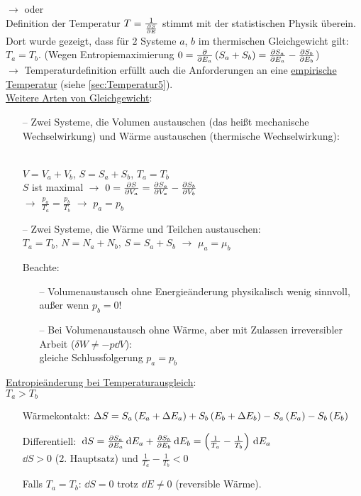 $\rightarrow$  oder \\
Definition der Temperatur $T = \frac{1}{\frac{\partial S}{\partial E}}$ stimmt mit der statistischen Physik überein.\\
Dort wurde gezeigt, dass für $2$ Systeme $a$, $b$ im thermischen Gleichgewicht gilt: $T_a= T_b$. (Wegen Entropiemaximierung $0=\frac{\partial }{\partial E_a}\left( S_a+S_b \right) = \frac{\partial S_a}{\partial E_a} - \frac{\partial S_b}{\partial E_b}$)\\
$\rightarrow$ Temperaturdefinition erfüllt auch die Anforderungen an eine \uline{empirische Temperatur} (siehe \ref{sec:Temperatur5}).\\
\uline{Weitere Arten von Gleichgewicht}:

\begin{itemize}[align=left]
  \item[--] Zwei Systeme, die Volumen austauschen (das heißt mechanische Wechselwirkung) und Wärme austauschen (thermische Wechselwirkung):\\
  {\centering
  
  }\\
  $V = V_a + V_b$, $S = S_a + S_b$, $T_a = T_b$\\
  $S$ ist maximal $\rightarrow$ $0 = \frac{\partial S}{\partial V_a} = \frac{\partial S_a}{\partial V_a} - \frac{\partial S_b}{\partial V_b}$\\
  $\rightarrow$ $\frac{p_a}{T_a} = \frac{p_b}{T_b}$ $\rightarrow$ $p_a = p_b$
  \item[--] Zwei Systeme, die Wärme und Teilchen austauschen:\\
  $T_a = T_b$, $N = N_a + N_b$, $S = S_a + S_b$ $\rightarrow$ $\mu_a = \mu_b$
  \item[Beachte:]
  \begin{itemize}
      \item[--] Volumenaustausch ohne Energieänderung physikalisch wenig sinnvoll, außer wenn $p_b = 0$!
      \item[--] Bei Volumenaustausch ohne Wärme, aber mit Zulassen irreversibler Arbeit ($\delta W \neq - p \dd{V}$):\\
      gleiche Schlussfolgerung $p_a = p_b$
  \end{itemize}
\end{itemize}

\uline{Entropieänderung bei Temperaturausgleich}:\\
 $T_a > T_b$

\begin{itemize}[align=left]
  \item[Wärmekontakt:] $\Delta S = S_a\left( E_a + \Delta E_a \right) + S_b\left( E_b + \Delta E_b \right) - S_a\left( E_a \right) - S_b\left( E_b \right)$
  \item[Differentiell:] $\,\text d{S} = \frac{\partial S_a}{\partial E_a}\,\text d{E_a} + \frac{\partial S_b}{\partial E_b}\,\text d{E_b} = \left( \frac{1}{T_a} - \frac{1}{T_b} \right)\,\text d{E_a}$\\
  $\dd{S} > 0$ (2. Hauptsatz) und $\frac{1}{T_a} - \frac{1}{T_b} < 0$
  \item[Falls $T_a = T_b$:] $\dd{S} = 0$ trotz $\dd{E} \neq 0$ (reversible Wärme).
\end{itemize}

